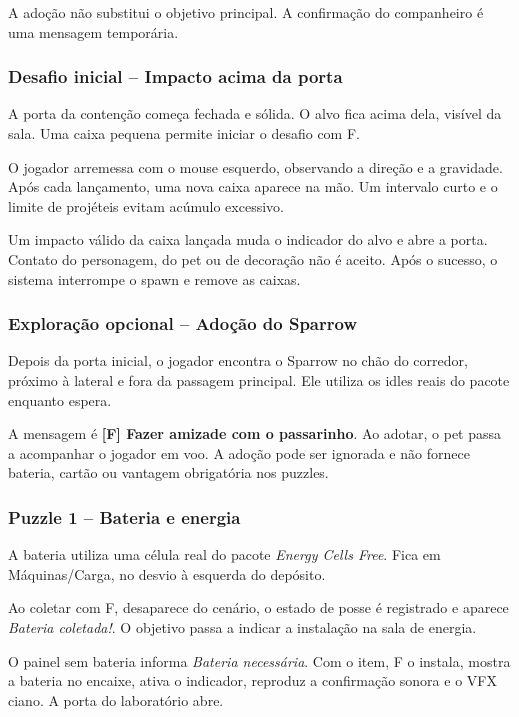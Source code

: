 \documentclass[12pt,a4paper]{article}
\begin{document}
A adoção não substitui o objetivo principal. A confirmação do
companheiro é uma mensagem temporária.

\subsubsection*{Desafio inicial -- Impacto acima da porta}

A porta da contenção começa fechada e sólida. O alvo fica acima dela,
visível da sala. Uma caixa pequena permite iniciar o desafio com F.

O jogador arremessa com o mouse esquerdo, observando a direção e a
gravidade. Após cada lançamento, uma nova caixa aparece na mão.
Um intervalo curto e o limite de projéteis evitam acúmulo excessivo.

Um impacto válido da caixa lançada muda o indicador do alvo e abre
a porta. Contato do personagem, do pet ou de decoração não é aceito.
Após o sucesso, o sistema interrompe o spawn e remove as caixas.

\subsubsection*{Exploração opcional -- Adoção do Sparrow}

Depois da porta inicial, o jogador encontra o Sparrow no chão do
corredor, próximo à lateral e fora da passagem principal. Ele utiliza
os idles reais do pacote enquanto espera.

A mensagem é \textbf{[F] Fazer amizade com o passarinho}. Ao adotar,
o pet passa a acompanhar o jogador em voo. A adoção pode ser ignorada
e não fornece bateria, cartão ou vantagem obrigatória nos puzzles.

\subsubsection*{Puzzle 1 -- Bateria e energia}

A bateria utiliza uma célula real do pacote \textit{Energy Cells Free}.
Fica em Máquinas/Carga, no desvio à esquerda do depósito.

Ao coletar com F, desaparece do cenário, o estado de posse é
registrado e aparece \emph{Bateria coletada!}. O objetivo passa a
indicar a instalação na sala de energia.

O painel sem bateria informa \emph{Bateria necessária}. Com o item,
F o instala, mostra a bateria no encaixe, ativa o indicador, reproduz
a confirmação sonora e o VFX ciano. A porta do laboratório abre.
\end{document}
